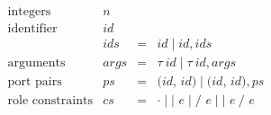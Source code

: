 \documentclass{report}
\begin{document}
\begin{figure}
\[ \begin{array}{lrcl}

\textrm{integers} & n & & \\
\textrm{identifier} & id & & \\
                    & ids & = & id \mid id, ids \\ [6pt]

\textrm{arguments}
                  & args & = & \tau~id \mid \tau~id, args \\
\textrm{port pairs} & ps & = & \texttt{($id$, $id$)} \mid \texttt{($id$, $id$)}, ps \\
\textrm{role constraints} & cs & = & \cdot \mid \texttt{|~$e$} \mid \texttt{/~$e$} \mid \texttt{|~$e$}~\texttt{/~$e$} \\ [6pt]


\end{array}\]
\end{figure}
\end{document}
